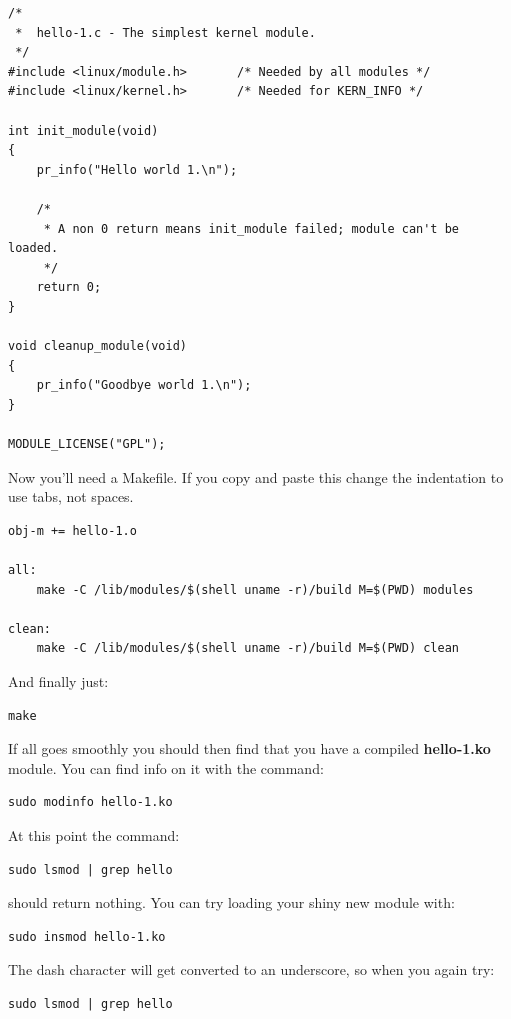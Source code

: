 \documentclass[11pt]{article}
\begin{document}
\begin{verbatim}
/*
 *  hello-1.c - The simplest kernel module.
 */
#include <linux/module.h>       /* Needed by all modules */
#include <linux/kernel.h>       /* Needed for KERN_INFO */

int init_module(void)
{
    pr_info("Hello world 1.\n");

    /*
     * A non 0 return means init_module failed; module can't be loaded.
     */
    return 0;
}

void cleanup_module(void)
{
    pr_info("Goodbye world 1.\n");
}

MODULE_LICENSE("GPL");
\end{verbatim}

Now you'll need a Makefile. If you copy and paste this change the indentation to use tabs, not spaces.

\begin{verbatim}
obj-m += hello-1.o

all:
	make -C /lib/modules/$(shell uname -r)/build M=$(PWD) modules

clean:
	make -C /lib/modules/$(shell uname -r)/build M=$(PWD) clean
\end{verbatim}

And finally just:

\begin{verbatim}
make
\end{verbatim}

If all goes smoothly you should then find that you have a compiled \textbf{hello-1.ko} module. You can find info on it with the command:

\begin{verbatim}
sudo modinfo hello-1.ko
\end{verbatim}

At this point the command:

\begin{verbatim}
sudo lsmod | grep hello
\end{verbatim}

should return nothing. You can try loading your shiny new module with:

\begin{verbatim}
sudo insmod hello-1.ko
\end{verbatim}

The dash character will get converted to an underscore, so when you again try:

\begin{verbatim}
sudo lsmod | grep hello
\end{verbatim}
\end{document}
